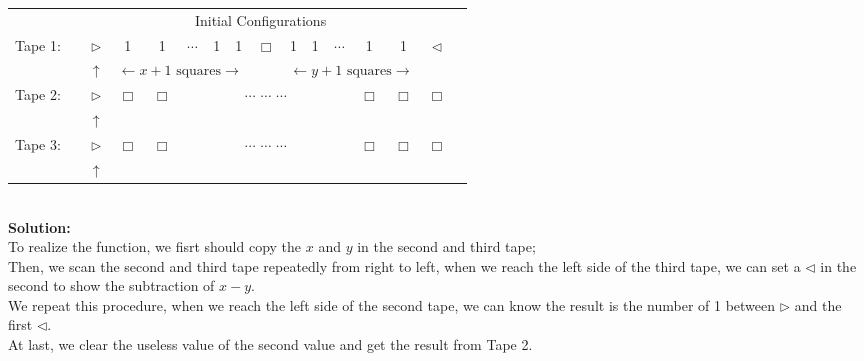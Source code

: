 \documentclass[12pt,a4paper]{article}
\theoremstyle{definition}
\numberwithin{equation}{section}
\numberwithin{figure}{section}
\begin{document}
\begin{enumerate}
  \begin{tabular}{ll|c|c|c|c|c|c|c|c|c|c|c|c|c|c}
      & \multicolumn{14}{c}{Initial Configurations}\\[5pt]
      \cline{2-16}
      Tape 1:& & $\triangleright$ &  1  & 1 & $\cdots$ & 1 & 1 & $\Box$ & 1 & 1 & $\cdots$ & 1 & 1 & $ \triangleleft$ & \\
      \cline{2-16}
      \multicolumn{2}{c}{} & \multicolumn{1}{c}{$\uparrow$} & \multicolumn{5}{c}{\color{blue}$\leftarrow x+1 \mbox{ squares}\rightarrow$} & \multicolumn{1}{c}{} & \multicolumn{5}{c}{\color{blue}$\leftarrow y+1 \mbox{ squares}\rightarrow$} & \multicolumn{2}{c}{}\\[4pt]
      \cline{2-16}
      Tape 2:& & $\triangleright$ & $\Box$ & $\Box$ & \multicolumn{7}{c|}{$\cdots$ \quad $\cdots$ \quad $\cdots$} & $\Box$ & $\Box$ & $\Box$ &\\
      \cline{2-16}
      \multicolumn{2}{c}{} & \multicolumn{1}{c}{$\uparrow$} & \multicolumn{11}{c}{}\\[4pt]
      \cline{2-16}
      Tape 3:& & $\triangleright$ & $\Box$ & $\Box$ & \multicolumn{7}{c|}{$\cdots$ \quad $\cdots$ \quad $\cdots$} & $\Box$ & $\Box$ & $\Box$ &\\
      \cline{2-16}
      \multicolumn{2}{c}{} & \multicolumn{1}{c}{$\uparrow$} & \multicolumn{13}{c}{}\\
      \end{tabular}\\
      
\textbf{Solution:}\\
To realize the function, we fisrt should copy the $x$ and $y$ in the second and third tape;\\
Then, we scan the second and third tape repeatedly from right to left, when we reach the left side of the third tape, we can set a $\triangleleft$ in the second to show the subtraction of $x - y$.\\
We repeat this procedure, when we reach the left side of the second tape, we can know the result is the number of 1 between $\triangleright$ and the first $\triangleleft$.\\
At last, we clear the useless value of the second value and get the result from Tape 2.\\


\end{enumerate}
\end{document}
